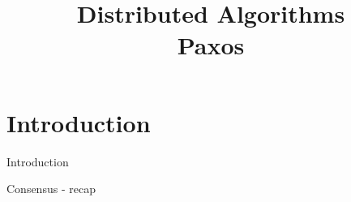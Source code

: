 \title[DS - Paxos]{\textbf{Distributed Algorithms}\\Paxos}






\begin{frame}
\titlepage


\end{frame}




\section{Introduction}

\begin{frame}{Introduction}
	
\begin{block}{Consensus - recap}	

	
\end{block}
	
\end{frame}


